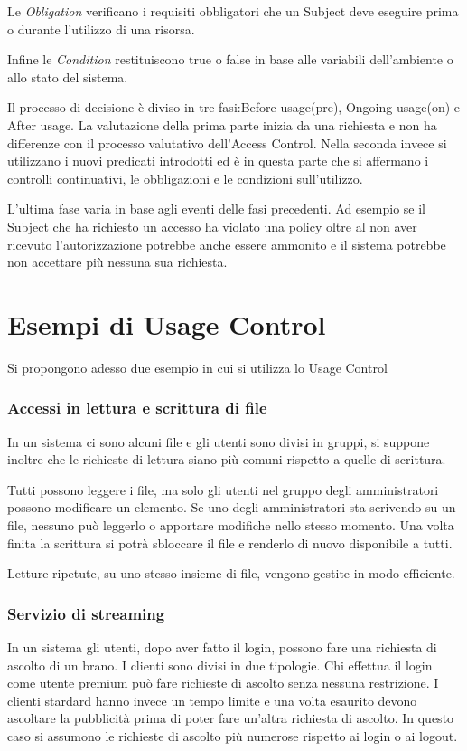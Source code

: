 Le \emph{Obligation} verificano i requisiti obbligatori che un Subject deve eseguire prima o durante l'utilizzo di una risorsa.\par
Infine le \emph{Condition} restituiscono true o false in base alle variabili dell'ambiente o allo stato del sistema.\par
Il processo di decisione è diviso in tre fasi\cite{SurveyUsageControl}:Before usage(pre), Ongoing usage(on) e After usage.
La valutazione della prima parte inizia da una richiesta e non ha differenze con il processo valutativo dell'Access Control.
Nella seconda invece si utilizzano i nuovi predicati introdotti ed è in questa parte che si affermano i controlli continuativi,
le obbligazioni e le condizioni sull'utilizzo.\par
L'ultima fase varia in base agli eventi delle fasi precedenti. Ad esempio se il Subject che ha richiesto un accesso ha violato
una policy oltre al non aver ricevuto l'autorizzazione potrebbe anche essere ammonito e il sistema potrebbe non accettare più
nessuna sua richiesta.

\section{Esempi di Usage Control}
\label{subs:es_UC}
Si propongono adesso due esempio in cui si utilizza lo Usage Control
\subsubsection*{Accessi in lettura e scrittura di file}
\label{subs:Accessi in lettura e scrittura di file}
In un sistema ci sono alcuni file e gli utenti sono divisi in gruppi, si suppone inoltre che le richieste di lettura
siano più comuni rispetto a quelle di scrittura.\par Tutti possono leggere i file, ma solo
gli utenti nel gruppo degli amministratori possono modificare un elemento. Se uno degli amministratori sta scrivendo
su un file, nessuno può leggerlo o apportare modifiche nello stesso momento. Una volta finita la scrittura si potrà sbloccare
il file e renderlo di nuovo disponibile a tutti.\par
Letture ripetute, su uno stesso insieme di file, vengono gestite in modo efficiente.
\subsubsection*{Servizio di streaming}
\label{subs:Servizio di streaming}
In un sistema gli utenti, dopo aver fatto il login, possono fare una richiesta di ascolto di un brano. I clienti
sono divisi in due tipologie. Chi effettua il login come utente premium può fare richieste di ascolto senza nessuna restrizione.
I clienti stardard hanno invece un tempo limite e una volta esaurito devono ascoltare la pubblicità prima di poter fare
un'altra richiesta di ascolto. In questo caso si assumono le richieste di ascolto più numerose rispetto ai login o ai logout.
